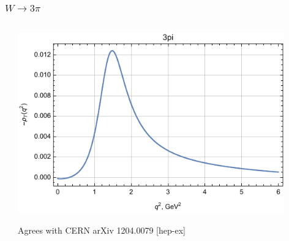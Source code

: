 \documentclass{beamer}
\begin{document}
\begin{frame}
  \frametitle{$W \to   3\pi$}
  \begin{columns}
    \begin{column}{0.5\textwidth}
    \end{column}
    \begin{column}{0.5\textwidth}
      \includegraphics[width=0.9\textwidth]{figs/rhoT_3pi_q2}

      {\tiny Agrees with CERN arXiv 1204.0079 [hep-ex]}
      

\end{column}
\end{columns}
\end{frame}
\end{document}
